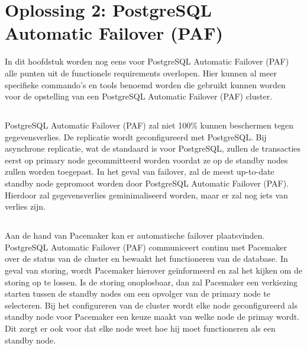 
\chapter{Oplossing 2: PostgreSQL Automatic Failover (PAF)}
\label{ch:Oplossing 2: PostgreSQL Automatic Failover (PAF)}

In dit hoofdstuk worden nog eens voor PostgreSQL Automatic Failover (PAF) alle punten uit de functionele requirements overlopen. Hier kunnen al meer specifieke commando's en tools benoemd worden die gebruikt kunnen worden voor de opstelling van een PostgreSQL Automatic Failover (PAF) cluster.


\section{}
\label{sec:Redundantie/Replicatie}

PostgreSQL Automatic Failover (PAF) zal niet 100\% kunnen beschermen tegen gegevensverlies. De replicatie wordt geconfigureerd met PostgreSQL. Bij asynchrone replicatie, wat de standaard is voor PostgreSQL, zullen de transacties eerst op primary node gecommitteerd worden voordat ze op de standby nodes zullen worden toegepast. In het geval van failover, zal de meest up-to-date standby node gepromoot worden door PostgreSQL Automatic Failover (PAF). Hierdoor zal gegevensverlies geminimaliseerd worden, maar er zal nog iets van verlies zijn. 


\section{}
\label{sec:Failover}

Aan de hand van Pacemaker kan er automatische failover plaatsvinden. PostgreSQL Automatic Failover (PAF) communiceert continu met Pacemaker over de status van de cluster en bewaakt het functioneren van de database. In geval van storing, wordt Pacemaker hierover geïnformeerd en zal het kijken om de storing op te lossen. Is de storing onoplosbaar, dan zal Pacemaker een verkiezing starten tussen de standby nodes om een opvolger van de primary node te selecteren.
Bij het configureren van de cluster wordt elke node geconfigureerd als standby node voor Pacemaker een keuze maakt van welke node de primay wordt. Dit zorgt er ook voor dat elke node weet hoe hij moet functioneren als een standby node.

